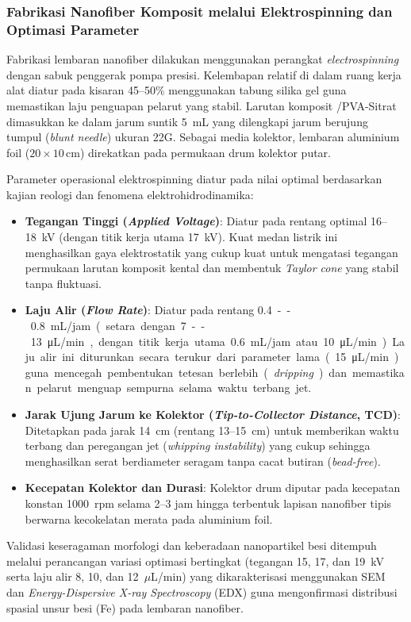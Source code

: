 \subsubsection{Fabrikasi Nanofiber Komposit melalui Elektrospinning dan Optimasi Parameter}
Fabrikasi lembaran nanofiber dilakukan menggunakan perangkat \textit{electrospinning} dengan sabuk penggerak pompa presisi. Kelembapan relatif di dalam ruang kerja alat diatur pada kisaran 45--50\% menggunakan tabung silika gel guna memastikan laju penguapan pelarut yang stabil. Larutan komposit /PVA-Sitrat dimasukkan ke dalam jarum suntik 5~mL yang dilengkapi jarum berujung tumpul (\textit{blunt needle}) ukuran 22G. Sebagai media kolektor, lembaran aluminium foil ($20 \times 10\,\text{cm}$) direkatkan pada permukaan drum kolektor putar.

Parameter operasional elektrospinning diatur pada nilai optimal berdasarkan kajian reologi dan fenomena elektrohidrodinamika:
\begin{itemize}
    \item \textbf{Tegangan Tinggi (\textit{Applied Voltage})}: Diatur pada rentang optimal 16--18~kV (dengan titik kerja utama \SI{17}{kV}). Kuat medan listrik ini menghasilkan gaya elektrostatik yang cukup kuat untuk mengatasi tegangan permukaan larutan komposit kental dan membentuk \textit{Taylor cone} yang stabil tanpa fluktuasi.
    \item \textbf{Laju Alir (\textit{Flow Rate})}: Diatur pada rentang \SI{0.4}--\SI{0.8}{mL/jam} (setara dengan \SI{7}--\SI{13}{\micro L/min}, dengan titik kerja utama \SI{0.6}{mL/jam} atau \SI{10}{\micro L/min}). Laju alir ini diturunkan secara terukur dari parameter lama (\SI{15}{\micro L/min}) guna mencegah pembentukan tetesan berlebih (\textit{dripping}) dan memastikan pelarut menguap sempurna selama waktu terbang jet.
    \item \textbf{Jarak Ujung Jarum ke Kolektor (\textit{Tip-to-Collector Distance}, TCD)}: Ditetapkan pada jarak \SI{14}{cm} (rentang 13--15~cm) untuk memberikan waktu terbang dan peregangan jet (\textit{whipping instability}) yang cukup sehingga menghasilkan serat berdiameter seragam tanpa cacat butiran (\textit{bead-free}).
    \item \textbf{Kecepatan Kolektor dan Durasi}: Kolektor drum diputar pada kecepatan konstan \SI{1000}{rpm} selama 2--3 jam hingga terbentuk lapisan nanofiber tipis berwarna kecokelatan merata pada aluminium foil.
\end{itemize}
Validasi keseragaman morfologi dan keberadaan nanopartikel besi ditempuh melalui perancangan variasi optimasi bertingkat (tegangan 15, 17, dan 19~kV serta laju alir 8, 10, dan 12~$\mu$L/min) yang dikarakterisasi menggunakan SEM dan \textit{Energy-Dispersive X-ray Spectroscopy} (EDX) guna mengonfirmasi distribusi spasial unsur besi (Fe) pada lembaran nanofiber.

